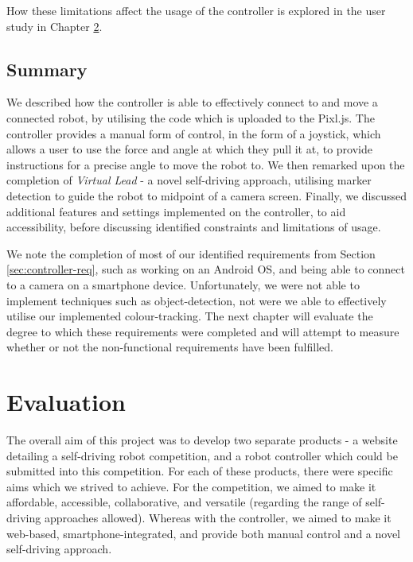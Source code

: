 \documentclass{l4proj}
\begin{document}
How these limitations affect the usage of the controller is explored in the user study in Chapter \ref{sec:evaluation}.


\section{Summary}
We described how the controller is able to effectively connect to and move a connected robot, by utilising the code which is uploaded to the Pixl.js. The controller provides a manual form of control, in the form of a joystick, which allows a user to use the force and angle at which they pull it at, to provide instructions for a precise angle to move the robot to. We then remarked upon the completion of \textit{Virtual Lead} - a novel self-driving approach, utilising marker detection to guide the robot to midpoint of a camera screen. Finally, we discussed additional features and settings implemented on the controller, to aid accessibility, before discussing identified constraints and limitations of usage.

We note the completion of most of our identified requirements from Section \ref{sec:controller-req}, such as working on an Android OS, and being able to connect to a camera on a smartphone device. Unfortunately, we were not able to implement techniques such as object-detection, not were we able to effectively utilise our implemented colour-tracking. The next chapter will evaluate the degree to which these requirements were completed and will attempt to measure whether or not the non-functional requirements have been fulfilled.

\chapter{Evaluation}\label{sec:evaluation}
The overall aim of this project was to develop two separate products - a website detailing a self-driving robot competition, and a robot controller which could be submitted into this competition. For each of these products, there were specific aims which we strived to achieve. For the competition, we aimed to make it affordable, accessible, collaborative, and versatile (regarding the range of self-driving approaches allowed). Whereas with the controller, we aimed to make it web-based, smartphone-integrated, and provide both manual control and a novel self-driving approach.
\end{document}
